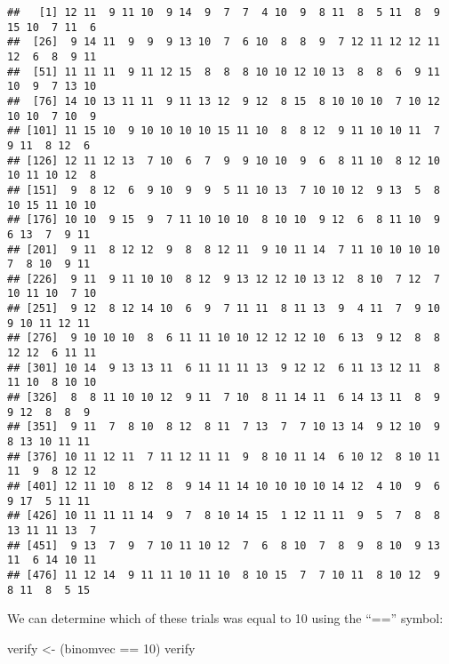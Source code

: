 \documentclass[
]{book}
\newenvironment{Shaded}{\begin{snugshade}}{\end{snugshade}}
\newcommand{\DecValTok}[1]{\textcolor[rgb]{0.00,0.00,0.81}{#1}}
\newcommand{\NormalTok}[1]{#1}
\newcommand{\OtherTok}[1]{\textcolor[rgb]{0.56,0.35,0.01}{#1}}
\newcommand{\SpecialCharTok}[1]{\textcolor[rgb]{0.00,0.00,0.00}{#1}}
\begin{document}
\begin{verbatim}
##   [1] 12 11  9 11 10  9 14  9  7  7  4 10  9  8 11  8  5 11  8  9 15 10  7 11  6
##  [26]  9 14 11  9  9  9 13 10  7  6 10  8  8  9  7 12 11 12 12 11 12  6  8  9 11
##  [51] 11 11 11  9 11 12 15  8  8  8 10 10 12 10 13  8  8  6  9 11 10  9  7 13 10
##  [76] 14 10 13 11 11  9 11 13 12  9 12  8 15  8 10 10 10  7 10 12 10 10  7 10  9
## [101] 11 15 10  9 10 10 10 10 15 11 10  8  8 12  9 11 10 10 11  7  9 11  8 12  6
## [126] 12 11 12 13  7 10  6  7  9  9 10 10  9  6  8 11 10  8 12 10 10 11 10 12  8
## [151]  9  8 12  6  9 10  9  9  5 11 10 13  7 10 10 12  9 13  5  8 10 15 11 10 10
## [176] 10 10  9 15  9  7 11 10 10 10  8 10 10  9 12  6  8 11 10  9  6 13  7  9 11
## [201]  9 11  8 12 12  9  8  8 12 11  9 10 11 14  7 11 10 10 10 10  7  8 10  9 11
## [226]  9 11  9 11 10 10  8 12  9 13 12 12 10 13 12  8 10  7 12  7 10 11 10  7 10
## [251]  9 12  8 12 14 10  6  9  7 11 11  8 11 13  9  4 11  7  9 10  9 10 11 12 11
## [276]  9 10 10 10  8  6 11 11 10 10 12 12 12 10  6 13  9 12  8  8 12 12  6 11 11
## [301] 10 14  9 13 13 11  6 11 11 11 13  9 12 12  6 11 13 12 11  8 11 10  8 10 10
## [326]  8  8 11 10 10 12  9 11  7 10  8 11 14 11  6 14 13 11  8  9  9 12  8  8  9
## [351]  9 11  7  8 10  8 12  8 11  7 13  7  7 10 13 14  9 12 10  9  8 13 10 11 11
## [376] 10 11 12 11  7 11 12 11 11  9  8 10 11 14  6 10 12  8 10 11 11  9  8 12 12
## [401] 12 11 10  8 12  8  9 14 11 14 10 10 10 10 14 12  4 10  9  6  9 17  5 11 11
## [426] 10 11 11 11 14  9  7  8 10 14 15  1 12 11 11  9  5  7  8  8 13 11 11 13  7
## [451]  9 13  7  9  7 10 11 10 12  7  6  8 10  7  8  9  8 10  9 13 11  6 14 10 11
## [476] 11 12 14  9 11 11 10 11 10  8 10 15  7  7 10 11  8 10 12  9  8 11  8  5 15
\end{verbatim}

We can determine which of these trials was equal to 10 using the ``=='' symbol:

\begin{Shaded}
\begin{Highlighting}[]
\NormalTok{verify }\OtherTok{\textless{}{-}}\NormalTok{ (binomvec }\SpecialCharTok{==} \DecValTok{10}\NormalTok{)}
\NormalTok{verify}
\end{Highlighting}
\end{Shaded}
\end{document}
